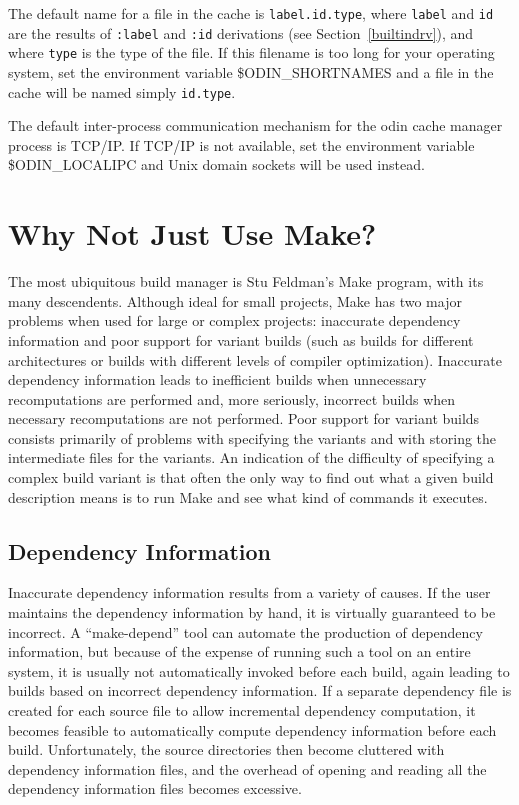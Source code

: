 \documentclass[hidelinks]{report}
\newcommand{\ex}{\tt}   %
\begin{document}
The default name for a file in the cache is {\ex label.id.type},
where {\ex label} and {\ex id} are the results of {\ex :label}
and {\ex :id} derivations (see Section~\ref{builtindrv}),
and where {\ex type} is the type of the file.
If this filename is too long for your operating system,
set the environment variable {\$ODIN\_SHORTNAMES} and a file
in the cache will be named simply {\ex id.type}.

The default inter-process communication mechanism 
for the odin cache manager process is TCP/IP.  
If TCP/IP is not available,
set the environment variable {\$ODIN\_LOCALIPC}
and Unix domain sockets will be used instead.


\section{Why Not Just Use Make?}

The most ubiquitous build manager is Stu Feldman's Make program\cite{Make},
with its many descendents\cite{Build}\cite{GNUMake}\cite{Mk}\cite{NMake}.
Although ideal for small projects, Make has two major problems when used
for large or complex projects: inaccurate dependency information and poor
support for variant builds (such as builds for different architectures
or builds with different levels of compiler optimization).
Inaccurate dependency information leads to
inefficient builds when unnecessary recomputations are performed and,
more seriously, incorrect builds when necessary recomputations are not
performed.
Poor support for variant builds consists primarily of problems
with specifying the variants
and with storing the intermediate files for the variants.
An indication of the difficulty of specifying a complex build variant
is that often the only way to find out what a given build
description means is to run Make and see what kind of commands it executes.

\subsection{Dependency Information}

Inaccurate dependency information results from a variety of causes.
If the user maintains the dependency information by hand,
it is virtually guaranteed to be incorrect.
A ``make-depend'' tool can automate the production of dependency information,
but because of the expense of running such a tool on an entire system,
it is usually not automatically invoked before each build,
again leading to builds based on incorrect dependency information.
If a separate dependency file is created for each source file
to allow incremental dependency computation,
it becomes feasible to automatically compute dependency information
before each build.
Unfortunately, the source directories then become cluttered with
dependency information files,
and the overhead of opening and reading all the dependency information
files becomes excessive.
\end{document}

